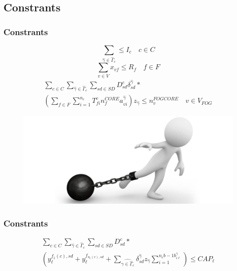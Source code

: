 \documentclass{beamer}
\begin{document}
\subsection{Constrants}
\begin{frame}
	\frametitle{Constrants}
	\begin{equation}
		\sum_{\hat{\gamma} \in \hat{\Gamma}_c} \leq I_c \quad c \in C	
	\end{equation}
	\begin{equation}
		\sum_{v \in V}x_{vf} \leq R_f  \quad f \in F
	\end{equation}
	\begin{equation}
	\begin{split}
		\sum_{c \in C} \sum_{\hat{\gamma}\in \hat{\Gamma}_c}\sum_{sd \in SD}D_{sd}^{c} \delta^{\hat{\gamma}}_{sd}*\\
		(\sum_{f \in F} \sum_{i=1}^{n_c}T_{fi}^c n_f^{CORE} a_{vi}^{\hat{\gamma}})z_{\hat{\gamma}} \leq n_v^{FOGCORE}\quad v \in V_{FOG}
    \end{split}
	\end{equation}
	
\begin{figure}
	\centering
	\includegraphics[width=0.4\linewidth]{constraints}
	\label{fig:constraints}
\end{figure}
\end{frame}
\begin{frame}
	\frametitle{Constrants}
		\begin{equation}
		\begin{split}
		\sum_{c \in C} \sum_{\hat{\gamma}\in \hat{\Gamma}_c}\sum_{sd \in SD}D_{sd}^{c}*\\
		(y_\ell^{f_1(c),sd}+y_\ell^{f_{n_c(c),sd}}+\sum_{\hat{\gamma \in \hat{\Gamma}_c}} \delta_{sd}^{\hat{\gamma}}z_{\hat{\gamma}}\sum_{i=1}^{n_cb-1b_{i \ell}^{\hat{\gamma}}}) \leq CAP_\ell
		\end{split}
		\end{equation}

\end{frame}
\end{document}
